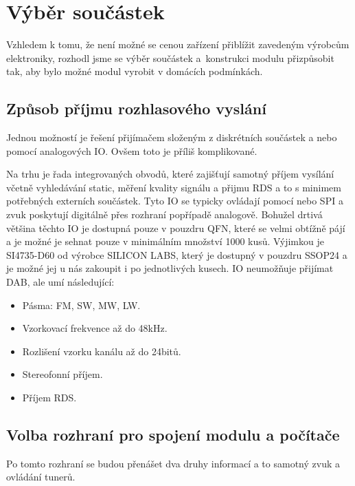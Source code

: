 \section{Výběr součástek}
\label{sec:Vyber}
Vzhledem k tomu, že není možné se cenou zařízení přiblížit zavedeným výrobcům elektroniky, rozhodl jsme se výběr součástek a~konstrukci modulu přizpůsobit tak, aby bylo možné modul vyrobit v domácích podmínkách.

 
\subsection{Způsob příjmu rozhlasového vyslání}
Jednou možností je řešení přijímačem složeným z diskrétních součástek a nebo pomocí analogových IO. Ovšem toto je příliš komplikované.

Na trhu je řada integrovaných obvodů, které zajišťují samotný příjem vysílání včetně vyhledávání static, měření kvality signálu a přijmu RDS a to s minimem potřebných externích součástek. Tyto IO se typicky ovládají pomocí \iic nebo SPI a zvuk poskytují digitálně přes rozhraní \iis popřípadě analogově. Bohužel drtivá většina těchto IO je dostupná pouze v pouzdru QFN, které se velmi obtížně pájí a je možné je sehnat pouze v minimálním množství 1000 kusů. Výjimkou je SI4735-D60 od výrobce SILICON LABS, který je dostupný v pouzdru SSOP24 a je možné jej u nás zakoupit i po jednotlivých kusech. IO neumožňuje přijímat DAB, ale umí následující:
\begin{itemize}
\item{Pásma: FM, SW, MW, LW.}
\item{Vzorkovací frekvence až do 48kHz.}
\item{Rozlišení vzorku kanálu až do 24bitů.}
\item{Stereofonní příjem.}
\item{Příjem RDS.}
\end{itemize}

\subsection{Volba rozhraní pro spojení modulu a počítače}
Po tomto rozhraní se budou přenášet dva druhy informací a to samotný zvuk a ovládání tunerů.

